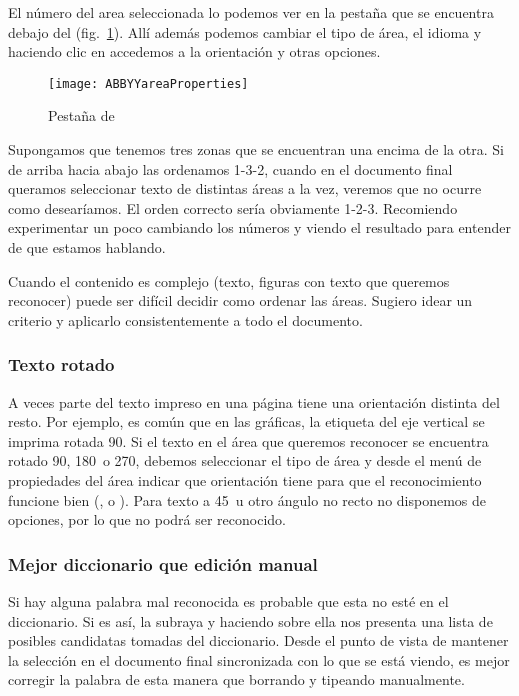 \documentclass[%
	a5paper,
	10pt,
	twoside,
	openright,
	final,
]{memoir}
\begin{document}
{	El número del area seleccionada lo podemos ver en la pestaña  que se encuentra debajo del  (fig.~\ref{fig:ABBYYareaProperties}). Allí además podemos cambiar el tipo de área, el idioma y haciendo clic en \keys{\,\faCaretRight} accedemos a la orientación y otras opciones.

	\begin{figure}
		\centering
		\texttt{[image: ABBYYareaProperties]}
		\caption[Pestaña \texttt{Area Properties} de \abbyy]{Pestaña  de \abbyy\label{fig:ABBYYareaProperties}}
	\end{figure}

	Supongamos que tenemos tres zonas que se encuentran una encima de la otra. Si de arriba hacia abajo las ordenamos 1-3-2, cuando en el documento final queramos seleccionar texto de distintas áreas a la vez, veremos que no ocurre como desearíamos. El orden correcto sería obviamente 1-2-3. Recomiendo experimentar un poco cambiando los números y viendo el resultado para entender de que estamos hablando.

	Cuando el contenido es complejo (texto, figuras con texto que queremos reconocer) puede ser difícil decidir como ordenar las áreas. Sugiero idear un criterio y aplicarlo consistentemente a todo el documento.

	\subsubsection{Texto rotado} A veces parte del texto impreso en una página tiene una orientación distinta del resto. Por ejemplo, es común que en las gráficas, la etiqueta del eje vertical se imprima rotada 90\textdegree. Si el texto en el área que queremos reconocer se encuentra rotado 90\textdegree, 180\textdegree\ o 270\textdegree, debemos seleccionar el tipo de área  y desde el menú de propiedades del área indicar que orientación tiene para que el reconocimiento funcione bien (,  o ). Para texto a 45\textdegree\ u otro ángulo no recto no disponemos de opciones, por lo que no podrá ser reconocido.

	\subsubsection{Mejor diccionario que edición manual} Si hay alguna palabra mal reconocida es probable que esta no esté en el diccionario. Si es así, \abbyy la subraya y haciendo \keys{\rightclick} sobre ella nos presenta una lista de posibles candidatas tomadas del diccionario. Desde el punto de vista de mantener la selección en el documento final sincronizada con lo que se está viendo, es mejor corregir la palabra de esta manera que borrando y tipeando manualmente.

}
\end{document}
